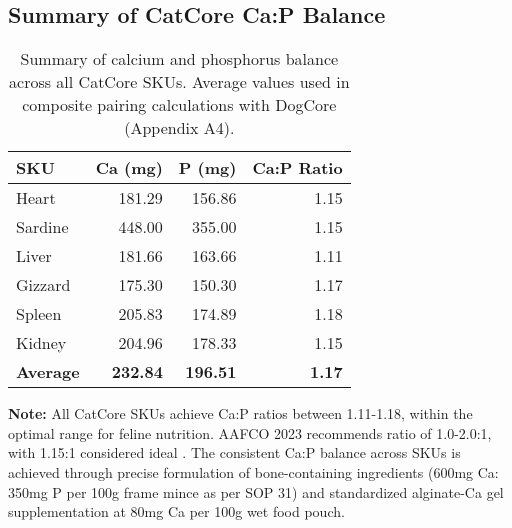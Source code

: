 \vspace{1em}

\subsection*{Summary of CatCore Ca:P Balance}

\begin{table}[htbp]
\centering
\begin{tabular}{@{}l r r r@{}}
\toprule
\textbf{SKU} & \textbf{Ca (mg)} & \textbf{P (mg)} & \textbf{Ca:P Ratio} \\
\midrule
Heart & 181.29 & 156.86 & 1.15 \\
Sardine & 448.00 & 355.00 & 1.15 \\
Liver & 181.66 & 163.66 & 1.11 \\
Gizzard & 175.30 & 150.30 & 1.17 \\
Spleen & 205.83 & 174.89 & 1.18 \\
Kidney & 204.96 & 178.33 & 1.15 \\
\midrule
\textbf{Average} & \textbf{232.84} & \textbf{196.51} & \textbf{1.17} \\
\bottomrule
\end{tabular}
\caption*{Summary of calcium and phosphorus balance across all CatCore SKUs. Average values used in composite pairing calculations with DogCore (Appendix A4).}
\end{table}

\vspace{1em}
\noindent\textbf{Note:} All CatCore SKUs achieve Ca:P ratios between 1.11-1.18, within the optimal range for feline nutrition. AAFCO 2023 recommends ratio of 1.0-2.0:1, with 1.15:1 considered ideal \cite{ref64}. The consistent Ca:P balance across SKUs is achieved through precise formulation of bone-containing ingredients (600mg Ca: 350mg P per 100g frame mince as per SOP 31) and standardized alginate-Ca gel supplementation at 80mg Ca per 100g wet food pouch.